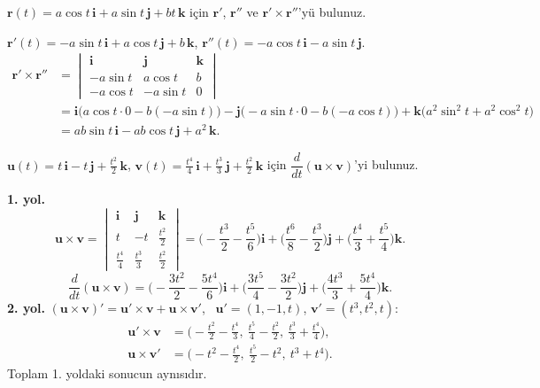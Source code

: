 \begin{soru}
$\mathbf r(t)=a\cos t\,\mathbf i+a\sin t\,\mathbf j+bt\,\mathbf k$ için $\mathbf r'$, $\mathbf r''$ ve $\mathbf r'\times\mathbf r''$'yü bulunuz.
\end{soru}
\begin{cevap}
$\mathbf r'(t)=-a\sin t\,\mathbf i+a\cos t\,\mathbf j+b\,\mathbf k$, \quad $\mathbf r''(t)=-a\cos t\,\mathbf i-a\sin t\,\mathbf j$.
\begin{align*}
\mathbf r'\times\mathbf r''&=\begin{vmatrix}\mathbf i&\mathbf j&\mathbf k\\-a\sin t&a\cos t&b\\-a\cos t&-a\sin t&0\end{vmatrix}\\
&=\mathbf i\big(a\cos t\cdot0-b(-a\sin t)\big)-\mathbf j\big(-a\sin t\cdot0-b(-a\cos t)\big)+\mathbf k\big(a^2\sin^2t+a^2\cos^2t\big)\\
&=ab\sin t\,\mathbf i-ab\cos t\,\mathbf j+a^2\,\mathbf k .
\end{align*}
\end{cevap}

\begin{soru}
$\mathbf u(t)=t\,\mathbf i-t\,\mathbf j+\frac{t^2}{2}\,\mathbf k$, $\mathbf v(t)=\frac{t^4}{4}\,\mathbf i+\frac{t^3}{3}\,\mathbf j+\frac{t^2}{2}\,\mathbf k$ için
$\dfrac{d}{dt}(\mathbf u\times\mathbf v)$'yi bulunuz.
\end{soru}
\begin{cevap}
\textbf{1. yol.}
\[ \mathbf u\times\mathbf v=\begin{vmatrix}\mathbf i&\mathbf j&\mathbf k\\t&-t&\frac{t^2}{2}\\\frac{t^4}{4}&\frac{t^3}{3}&\frac{t^2}{2}\end{vmatrix}
=\Big(-\frac{t^3}{2}-\frac{t^5}{6}\Big)\mathbf i+\Big(\frac{t^6}{8}-\frac{t^3}{2}\Big)\mathbf j+\Big(\frac{t^4}{3}+\frac{t^5}{4}\Big)\mathbf k . \]
\[ \frac{d}{dt}(\mathbf u\times\mathbf v)=\Big(-\frac{3t^2}{2}-\frac{5t^4}{6}\Big)\mathbf i+\Big(\frac{3t^5}{4}-\frac{3t^2}{2}\Big)\mathbf j+\Big(\frac{4t^3}{3}+\frac{5t^4}{4}\Big)\mathbf k . \]
\textbf{2. yol.} $(\mathbf u\times\mathbf v)'=\mathbf u'\times\mathbf v+\mathbf u\times\mathbf v'$, \ $\mathbf u'=(1,-1,t)$, $\mathbf v'=(t^3,t^2,t)$:
\begin{align*}
\mathbf u'\times\mathbf v&=\Big(-\frac{t^2}{2}-\frac{t^4}{3},\ \frac{t^5}{4}-\frac{t^2}{2},\ \frac{t^3}{3}+\frac{t^4}{4}\Big),\\
\mathbf u\times\mathbf v'&=\Big(-t^2-\frac{t^4}{2},\ \frac{t^5}{2}-t^2,\ t^3+t^4\Big).
\end{align*}
Toplam 1. yoldaki sonucun aynısıdır. \checkmark
\end{cevap}

